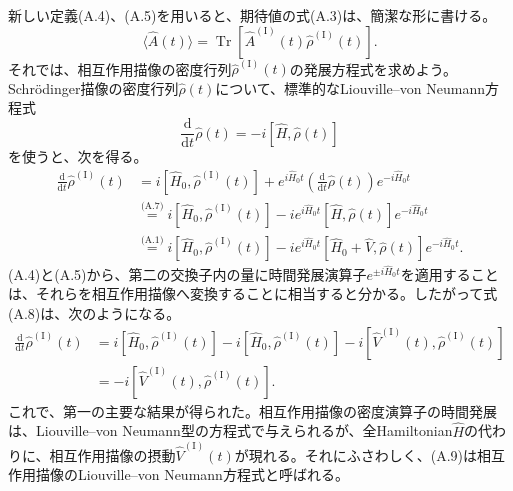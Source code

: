 新しい定義(A.4)、(A.5)を用いると、期待値の式(A.3)は、簡潔な形に書ける。
\begin{equation}
\langle\hat A(t)\rangle=\operatorname{Tr}[\hat A^{(\mathrm I)}(t)\hat\rho^{(\mathrm I)}(t)].\tag{A.6}
\end{equation}
それでは、相互作用描像の密度行列$\hat\rho^{(\mathrm I)}(t)$の発展方程式を求めよう。Schrödinger描像の密度行列$\hat\rho(t)$について、標準的なLiouville--von Neumann方程式
\begin{equation}
\frac{\mathrm d}{\mathrm dt}\hat\rho(t)=-i[\hat H,\hat\rho(t)]\tag{A.7}
\end{equation}
を使うと、次を得る。
\begin{equation}
\begin{aligned}
\frac{\mathrm d}{\mathrm dt}\hat\rho^{(\mathrm I)}(t)
&=i[\hat H_0,\hat\rho^{(\mathrm I)}(t)]+e^{i\hat H_0t}\left(\frac{\mathrm d}{\mathrm dt}\hat\rho(t)\right)e^{-i\hat H_0t}\\
&\overset{\text{(A.7)}}=i[\hat H_0,\hat\rho^{(\mathrm I)}(t)]-ie^{i\hat H_0t}[\hat H,\hat\rho(t)]e^{-i\hat H_0t}\\
&\overset{\text{(A.1)}}=i[\hat H_0,\hat\rho^{(\mathrm I)}(t)]-ie^{i\hat H_0t}[\hat H_0+\hat V,\hat\rho(t)]e^{-i\hat H_0t}.
\end{aligned}\tag{A.8}
\end{equation}
(A.4)と(A.5)から、第二の交換子内の量に時間発展演算子$e^{\pm i\hat H_0t}$を適用することは、それらを相互作用描像へ変換することに相当すると分かる。したがって式(A.8)は、次のようになる。
\begin{equation}
\begin{aligned}
\frac{\mathrm d}{\mathrm dt}\hat\rho^{(\mathrm I)}(t)
&=i[\hat H_0,\hat\rho^{(\mathrm I)}(t)]-i[\hat H_0,\hat\rho^{(\mathrm I)}(t)]
-i[\hat V^{(\mathrm I)}(t),\hat\rho^{(\mathrm I)}(t)]\\
&=-i[\hat V^{(\mathrm I)}(t),\hat\rho^{(\mathrm I)}(t)].
\end{aligned}\tag{A.9}
\end{equation}
これで、第一の主要な結果が得られた。相互作用描像の密度演算子の時間発展は、Liouville--von Neumann型の方程式で与えられるが、全Hamiltonian$\hat H$の代わりに、相互作用描像の摂動$\hat V^{(\mathrm I)}(t)$が現れる。それにふさわしく、(A.9)は相互作用描像のLiouville--von Neumann方程式と呼ばれる。

